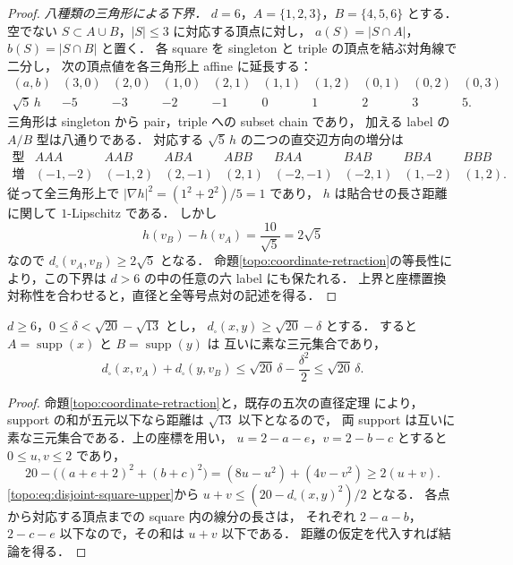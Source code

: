 \begin{proof}
\emph{八種類の三角形による下界．}
$d=6$，$A=\{1,2,3\}$，$B=\{4,5,6\}$ とする．
空でない $S\subset A\cup B$，$|S|\le3$ に対応する頂点に対し，
$a(S)=|S\cap A|$，$b(S)=|S\cap B|$ と置く．
各 square を singleton と triple の頂点を結ぶ対角線で二分し，
次の頂点値を各三角形上 affine に延長する：
\[
\begin{array}{c|rrrrrrrrr}
 (a,b)&(3,0)&(2,0)&(1,0)&(2,1)&(1,1)&(1,2)&(0,1)&(0,2)&(0,3)\\\hline
 \sqrt5\,h&-5&-3&-2&-1&0&1&2&3&5.
\end{array}
\]
三角形は singleton から pair，triple への subset chain であり，
加える label の $A/B$ 型は八通りである．
対応する $\sqrt5\,h$ の二つの直交辺方向の増分は
\[
\begin{array}{c|rrrrrrrr}
 \text{型}&AAA&AAB&ABA&ABB&BAA&BAB&BBA&BBB\\\hline
 \text{増分}&(-1,-2)&(-1,2)&(2,-1)&(2,1)&(-2,-1)&(-2,1)&(1,-2)&(1,2).
\end{array}
\]
従って全三角形上で $|\nabla h|^2=(1^2+2^2)/5=1$ であり，
$h$ は貼合せの長さ距離に関して $1$-Lipschitz である．
しかし
\[
 h(v_B)-h(v_A)=\frac{10}{\sqrt5}=2\sqrt5
\]
なので $d_\square(v_A,v_B)\ge2\sqrt5$ となる．
命題\ref{topo:coordinate-retraction}の等長性により，この下界は
$d>6$ の中の任意の六 label にも保たれる．
上界と座標置換対称性を合わせると，直径と全等号点対の記述を得る．
\end{proof}

\begin{corollary}[六次以上の直径対の線形安定性]
\label{topo:diameter-six-stability}
$d\ge6$，$0\le\delta<\sqrt{20}-\sqrt{13}$ とし，
$d_\square(x,y)\ge\sqrt{20}-\delta$ とする．
すると $A=\operatorname{supp}(x)$ と $B=\operatorname{supp}(y)$ は
互いに素な三元集合であり，
\[
 d_\square(x,v_A)+d_\square(y,v_B)
 \le\sqrt{20}\,\delta-\frac{\delta^2}{2}
 \le\sqrt{20}\,\delta.
\]
\end{corollary}
\begin{proof}
命題\ref{topo:coordinate-retraction}と，既存の五次の直径定理
\cite[\texttt{thm:intro-diameter-C5}, \texttt{sec:finite-diameter}]{KECubicalCurrent}
により，support の和が五元以下なら距離は $\sqrt{13}$ 以下となるので，
両 support は互いに素な三元集合である．上の座標を用い，
$u=2-a-e$，$v=2-b-c$ とすると $0\le u,v\le2$ であり，
\[
 20-\bigl((a+e+2)^2+(b+c)^2\bigr)
 =(8u-u^2)+(4v-v^2)\ge2(u+v).
\]
\eqref{topo:eq:disjoint-square-upper}から
$u+v\le(20-d_\square(x,y)^2)/2$ となる．
各点から対応する頂点までの square 内の線分の長さは，
それぞれ $2-a-b$，$2-c-e$ 以下なので，その和は $u+v$ 以下である．
距離の仮定を代入すれば結論を得る．
\end{proof}

